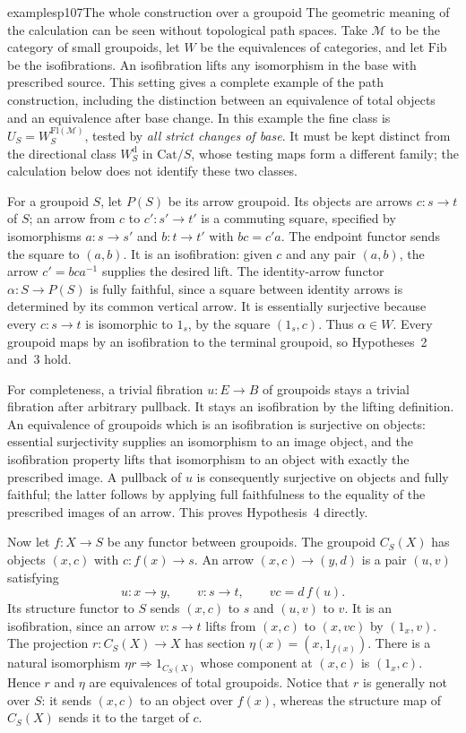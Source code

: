 \begin{dcomment}{examples}{p107}{The whole construction over a groupoid}
The geometric meaning of the calculation can be seen without topological path spaces. Take $\mathcal M$ to be the category of small groupoids, let $W$ be the equivalences of categories, and let $\mathrm{Fib}$ be the isofibrations. An isofibration lifts any isomorphism in the base with prescribed source. This setting gives a complete example of the path construction, including the distinction between an equivalence of total objects and an equivalence after base change. In this example the fine class is $U_S=W_S^{\mathrm{Fl}(\mathcal M)}$, tested by \emph{all strict changes of base}. It must be kept distinct from the directional class $W_S^{\mathrm d}$ in $\mathrm{Cat}/S$, whose testing maps form a different family; the calculation below does not identify these two classes.

For a groupoid $S$, let $P(S)$ be its arrow groupoid. Its objects are arrows $c:s\to t$ of $S$; an arrow from $c$ to $c':s'\to t'$ is a commuting square, specified by isomorphisms $a:s\to s'$ and $b:t\to t'$ with $bc=c'a$. The endpoint functor sends the square to $(a,b)$. It is an isofibration: given $c$ and any pair $(a,b)$, the arrow $c'=bca^{-1}$ supplies the desired lift. The identity-arrow functor $\alpha:S\to P(S)$ is fully faithful, since a square between identity arrows is determined by its common vertical arrow. It is essentially surjective because every $c:s\to t$ is isomorphic to $1_s$, by the square $(1_s,c)$. Thus $\alpha\in W$. Every groupoid maps by an isofibration to the terminal groupoid, so Hypotheses~2 and~3 hold.

For completeness, a trivial fibration $u:E\to B$ of groupoids stays a trivial fibration after arbitrary pullback. It stays an isofibration by the lifting definition. An equivalence of groupoids which is an isofibration is surjective on objects: essential surjectivity supplies an isomorphism to an image object, and the isofibration property lifts that isomorphism to an object with exactly the prescribed image. A pullback of $u$ is consequently surjective on objects and fully faithful; the latter follows by applying full faithfulness to the equality of the prescribed images of an arrow. This proves Hypothesis~4 directly.

Now let $f:X\to S$ be any functor between groupoids. The groupoid $C_S(X)$ has objects $(x,c)$ with $c:f(x)\to s$. An arrow $(x,c)\to(y,d)$ is a pair $(u,v)$ satisfying
\[
u:x\to y,\qquad v:s\to t,\qquad vc=d\,f(u).
\]
Its structure functor to $S$ sends $(x,c)$ to $s$ and $(u,v)$ to $v$. It is an isofibration, since an arrow $v:s\to t$ lifts from $(x,c)$ to $(x,vc)$ by $(1_x,v)$. The projection $r:C_S(X)\to X$ has section $\eta(x)=(x,1_{f(x)})$. There is a natural isomorphism $\eta r\Rightarrow1_{C_S(X)}$ whose component at $(x,c)$ is $(1_x,c)$. Hence $r$ and $\eta$ are equivalences of total groupoids. Notice that $r$ is generally not over $S$: it sends $(x,c)$ to an object over $f(x)$, whereas the structure map of $C_S(X)$ sends it to the target of $c$.


\end{dcomment}
